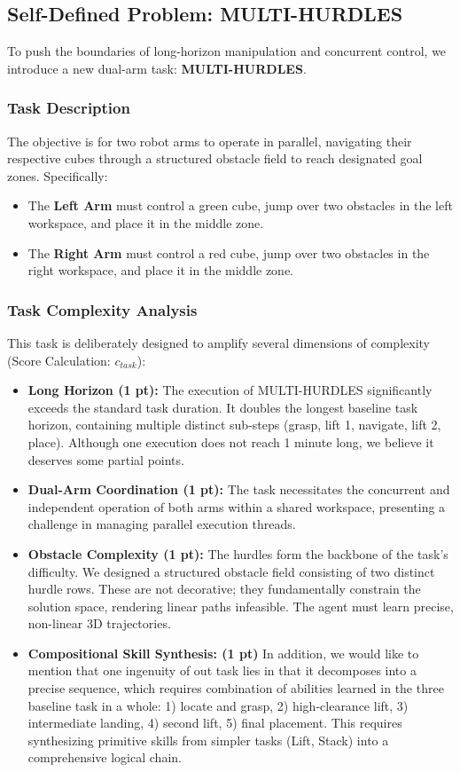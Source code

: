 \documentclass[10pt]{article} %
\begin{document}
\subsection{Self-Defined Problem: MULTI-HURDLES}

To push the boundaries of long-horizon manipulation and concurrent control, we introduce a new dual-arm task: \textbf{MULTI-HURDLES}.

\subsubsection{Task Description}
The objective is for two robot arms to operate in parallel, navigating their respective cubes through a structured obstacle field to reach designated goal zones. Specifically:
\begin{itemize}
    \item The \textbf{Left Arm} must control a green cube, jump over two obstacles in the left workspace, and place it in the middle zone.
    \item The \textbf{Right Arm} must control a red cube, jump over two obstacles in the right workspace, and place it in the middle zone.
\end{itemize}

\subsubsection{Task Complexity Analysis}
This task is deliberately designed to amplify several dimensions of complexity (Score Calculation: $c_{task}$):

\begin{itemize}
    \item \textbf{Long Horizon (1 pt):} The execution of MULTI-HURDLES significantly exceeds the standard task duration. It doubles the longest baseline task horizon, containing multiple distinct sub-steps (grasp, lift 1, navigate, lift 2, place). Although one execution does not reach 1 minute long, we believe it deserves some partial points.
    \item \textbf{Dual-Arm Coordination (1 pt):} The task necessitates the concurrent and independent operation of both arms within a shared workspace, presenting a challenge in managing parallel execution threads.
    \item \textbf{Obstacle Complexity (1 pt):} The hurdles form the backbone of the task's difficulty. We designed a structured obstacle field consisting of two distinct hurdle rows. These are not decorative; they fundamentally constrain the solution space, rendering linear paths infeasible. The agent must learn precise, non-linear 3D trajectories.
    \item \textbf{Compositional Skill Synthesis: (1 pt)} In addition, we would like to mention that one ingenuity of out task lies in that it decomposes into a precise sequence, which requires combination of abilities learned in the three baseline task in a whole: 1) locate and grasp, 2) high-clearance lift, 3) intermediate landing, 4) second lift, 5) final placement. This requires synthesizing primitive skills from simpler tasks (Lift, Stack) into a comprehensive logical chain.
\end{itemize}
\end{document}
